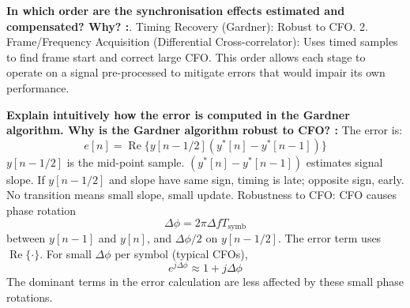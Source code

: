 \documentclass[11pt]{article}
\begin{document}
	\par\noindent\textbf{In which order are the synchronisation effects estimated and compensated? Why? :}\quad{}. Timing Recovery (Gardner): Robust to CFO.
		2. Frame/Frequency Acquisition (Differential Cross-correlator): Uses timed samples to find frame start and correct large CFO.
		This order allows each stage to operate on a signal pre-processed to mitigate errors that would impair its own performance.
	\par
			
	\par\noindent\textbf{Explain intuitively how the error is computed in the Gardner algorithm. Why is the Gardner algorithm robust to CFO? :}\quad\ignorespaces 
		The error is:
		\begin{equation} e[n] = \operatorname{Re} \{ y[n-1/2] ( y^{*}[n] - y^{*}[n-1] ) \} \end{equation}
		$y[n-1/2]$ is the mid-point sample. $(y^{*}[n] - y^{*}[n-1])$ estimates signal slope. If $y[n-1/2]$ and slope have same sign, timing is late; opposite sign, early. No transition means small slope, small update.
		Robustness to CFO: CFO causes phase rotation
		\begin{equation} \Delta\phi = 2\pi \Delta f T_{\text{symb}} \end{equation}
		between $y[n-1]$ and $y[n]$, and $\Delta\phi/2$ on $y[n-1/2]$. The error term uses $\operatorname{Re}\{\cdot\}$. For small $\Delta\phi$ per symbol (typical CFOs),
		\begin{equation} e^{j\Delta\phi} \approx 1+j\Delta\phi \end{equation}
		The dominant terms in the error calculation are less affected by these small phase rotations.
	\par
			
\end{document}
